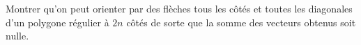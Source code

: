Montrer qu'on peut orienter par des flèches tous les côtés et toutes les diagonales d'un polygone régulier à $2n$ côtés de sorte que la somme des vecteurs obtenus soit nulle.
